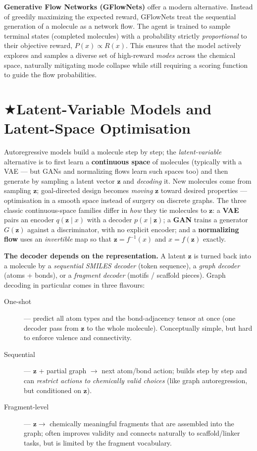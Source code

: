 \documentclass[11pt, oneside]{book}
\makeatletter
\newcommand{\starglyph}{\textcolor{stargold}{\ensuremath{\bigstar}}}
\newcommand{\starsec}[1]{%
  \texorpdfstring{\starglyph\hspace{0.4em}\textcolor{star@frame}{#1}}{#1}}
\newcommand{\zvec}{\mathbf{z}}
\makeatother
\begin{document}
\textbf{Generative Flow Networks (GFlowNets)} offer a modern alternative. Instead of greedily maximizing the expected reward, GFlowNets treat the sequential generation of a molecule as a network flow. The agent is trained to sample terminal states (completed molecules) with a probability strictly \emph{proportional} to their objective reward, $P(x) \propto R(x)$. This ensures that the model actively explores and samples a diverse set of high-reward \emph{modes} across the chemical space, naturally mitigating mode collapse while still requiring a scoring function to guide the flow probabilities.
\vspace{-0.5 cm}
\section{\starsec{Latent-Variable Models and Latent-Space Optimisation}}

Autoregressive models build a molecule step by step; the \emph{latent-variable}
alternative is to first learn a \textbf{continuous space} of molecules (typically with
a VAE --- but GANs and normalizing flows learn such spaces too) and then generate by
sampling a latent vector $\zvec$ and \emph{decoding} it.
New molecules come from sampling $\zvec$; goal-directed design becomes \emph{moving}
$\zvec$ toward desired properties --- optimisation in a smooth space instead of
surgery on discrete graphs.
The three classic continuous-space families differ in \emph{how} they tie molecules to
$\zvec$: a \textbf{VAE} pairs an encoder $q(\zvec\mid x)$ with a decoder
$p(x\mid\zvec)$; a \textbf{GAN} trains a generator $G(\zvec)$ against a discriminator,
with no explicit encoder; and a \textbf{normalizing flow} uses an \emph{invertible} map
so that $\zvec=f^{-1}(x)$ and $x=f(\zvec)$ exactly.

\textbf{The decoder depends on the representation.} A latent $\zvec$ is turned back
into a molecule by a \emph{sequential SMILES decoder} (token sequence), a \emph{graph
decoder} (atoms + bonds), or a \emph{fragment decoder} (motifs / scaffold pieces).
Graph decoding in particular comes in three flavours:
\begin{description}
  \item[One-shot] --- predict all atom types and the bond-adjacency tensor at once
        (one decoder pass from $\zvec$ to the whole molecule). Conceptually simple, but
        hard to enforce valence and connectivity.
  \item[Sequential] --- $\zvec$ + partial graph $\to$ next atom/bond action; builds
        step by step and can \emph{restrict actions to chemically valid choices} (like
        graph autoregression, but conditioned on $\zvec$).
  \item[Fragment-level] --- $\zvec \to$ chemically meaningful fragments that are
        assembled into the graph; often improves validity and connects naturally to
        scaffold/linker tasks, but is limited by the fragment vocabulary.
\end{description}
\end{document}

